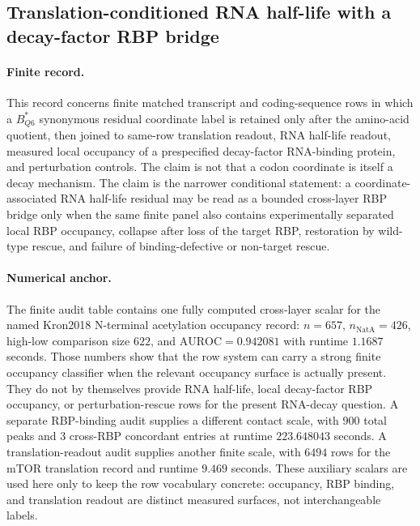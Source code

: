 \subsection{Translation-conditioned RNA half-life with a decay-factor RBP bridge}
\label{sec:bioreality-q6-rna-half-life-rbp-bridge}

\paragraph{Finite record.}
This record concerns finite matched transcript and coding-sequence rows in which a $B^{*}_{Q6}$ synonymous residual coordinate label is retained only after the amino-acid quotient, then joined to same-row translation readout, RNA half-life readout, measured local occupancy of a prespecified decay-factor RNA-binding protein, and perturbation controls.  The claim is not that a codon coordinate is itself a decay mechanism.  The claim is the narrower conditional statement: a coordinate-associated RNA half-life residual may be read as a bounded cross-layer RBP bridge only when the same finite panel also contains experimentally separated local RBP occupancy, collapse after loss of the target RBP, restoration by wild-type rescue, and failure of binding-defective or non-target rescue.

\paragraph{Numerical anchor.}
The finite audit table contains one fully computed cross-layer scalar for the named Kron2018 N-terminal acetylation occupancy record: $n=657$, $n_{\mathrm{NatA}}=426$, high-low comparison size $622$, and $\mathrm{AUROC}=0.942081$ with runtime $1.1687$ seconds.  Those numbers show that the row system can carry a strong finite occupancy classifier when the relevant occupancy surface is actually present.  They do not by themselves provide RNA half-life, local decay-factor RBP occupancy, or perturbation-rescue rows for the present RNA-decay question.  A separate RBP-binding audit supplies a different contact scale, with $900$ total peaks and $3$ cross-RBP concordant entries at runtime $223.648043$ seconds.  A translation-readout audit supplies another finite scale, with $6494$ rows for the mTOR translation record and runtime $9.469$ seconds.  These auxiliary scalars are used here only to keep the row vocabulary concrete: occupancy, RBP binding, and translation readout are distinct measured surfaces, not interchangeable labels.

